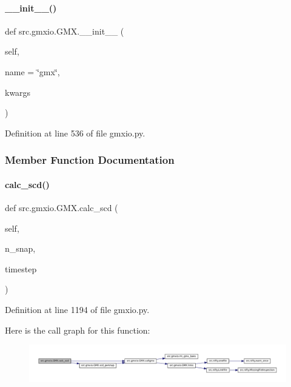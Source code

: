 \paragraph{\texorpdfstring{\+\_\+\+\_\+init\+\_\+\+\_\+()}{\_\_init\_\_()}}
{\footnotesize\ttfamily def src.\+gmxio.\+G\+M\+X.\+\_\+\+\_\+init\+\_\+\+\_\+ (\begin{DoxyParamCaption}\item[{}]{self,  }\item[{}]{name = {\ttfamily \char`\"{}gmx\char`\"{}},  }\item[{}]{kwargs }\end{DoxyParamCaption})}



Definition at line 536 of file gmxio.\+py.



\subsubsection{Member Function Documentation}
\mbox{\label{classsrc_1_1gmxio_1_1GMX_a1dfcbef267b12f239d0670ecbe1f41d8}} 
\paragraph{\texorpdfstring{calc\+\_\+scd()}{calc\_scd()}}
{\footnotesize\ttfamily def src.\+gmxio.\+G\+M\+X.\+calc\+\_\+scd (\begin{DoxyParamCaption}\item[{}]{self,  }\item[{}]{n\+\_\+snap,  }\item[{}]{timestep }\end{DoxyParamCaption})}



Definition at line 1194 of file gmxio.\+py.

Here is the call graph for this function\+:
\nopagebreak
\begin{figure}[H]
\begin{center}
\leavevmode
\includegraphics[width=350pt]{classsrc_1_1gmxio_1_1GMX_a1dfcbef267b12f239d0670ecbe1f41d8_cgraph}
\end{center}
\end{figure}
\mbox{\label{classsrc_1_1gmxio_1_1GMX_a9cd8a8dde96ee479107dd2933922235d}} 

